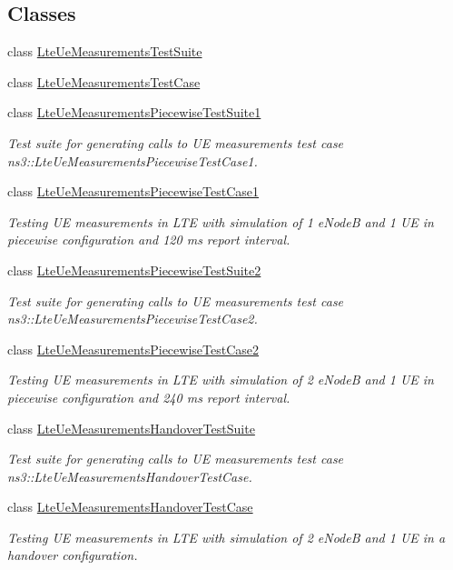 \subsection*{Classes}
\begin{DoxyCompactItemize}
\item 
class \hyperlink{classLteUeMeasurementsTestSuite}{Lte\+Ue\+Measurements\+Test\+Suite}
\item 
class \hyperlink{classLteUeMeasurementsTestCase}{Lte\+Ue\+Measurements\+Test\+Case}
\item 
class \hyperlink{classLteUeMeasurementsPiecewiseTestSuite1}{Lte\+Ue\+Measurements\+Piecewise\+Test\+Suite1}
\begin{DoxyCompactList}\small\item\em Test suite for generating calls to UE measurements test case ns3\+::\+Lte\+Ue\+Measurements\+Piecewise\+Test\+Case1. \end{DoxyCompactList}\item 
class \hyperlink{classLteUeMeasurementsPiecewiseTestCase1}{Lte\+Ue\+Measurements\+Piecewise\+Test\+Case1}
\begin{DoxyCompactList}\small\item\em Testing UE measurements in L\+TE with simulation of 1 e\+NodeB and 1 UE in piecewise configuration and 120 ms report interval. \end{DoxyCompactList}\item 
class \hyperlink{classLteUeMeasurementsPiecewiseTestSuite2}{Lte\+Ue\+Measurements\+Piecewise\+Test\+Suite2}
\begin{DoxyCompactList}\small\item\em Test suite for generating calls to UE measurements test case ns3\+::\+Lte\+Ue\+Measurements\+Piecewise\+Test\+Case2. \end{DoxyCompactList}\item 
class \hyperlink{classLteUeMeasurementsPiecewiseTestCase2}{Lte\+Ue\+Measurements\+Piecewise\+Test\+Case2}
\begin{DoxyCompactList}\small\item\em Testing UE measurements in L\+TE with simulation of 2 e\+NodeB and 1 UE in piecewise configuration and 240 ms report interval. \end{DoxyCompactList}\item 
class \hyperlink{classLteUeMeasurementsHandoverTestSuite}{Lte\+Ue\+Measurements\+Handover\+Test\+Suite}
\begin{DoxyCompactList}\small\item\em Test suite for generating calls to UE measurements test case ns3\+::\+Lte\+Ue\+Measurements\+Handover\+Test\+Case. \end{DoxyCompactList}\item 
class \hyperlink{classLteUeMeasurementsHandoverTestCase}{Lte\+Ue\+Measurements\+Handover\+Test\+Case}
\begin{DoxyCompactList}\small\item\em Testing UE measurements in L\+TE with simulation of 2 e\+NodeB and 1 UE in a handover configuration. \end{DoxyCompactList}\end{DoxyCompactItemize}
